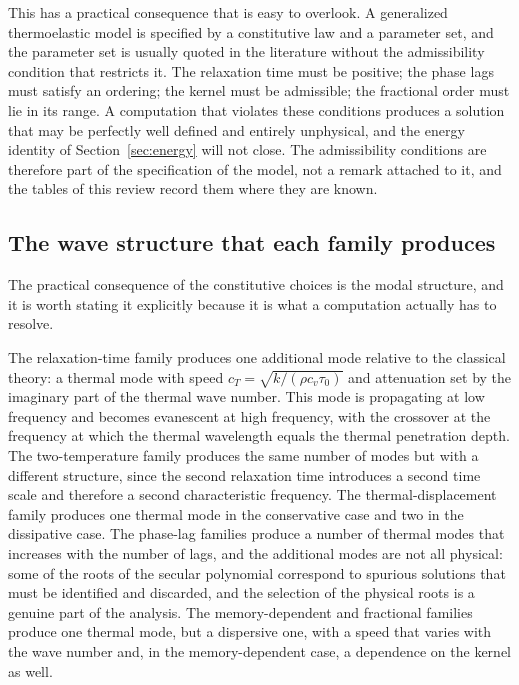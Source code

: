 This has a practical consequence that is easy to overlook. A generalized thermoelastic model is specified by a constitutive law and a parameter set, and the parameter set is usually quoted in the literature without the admissibility condition that restricts it. The relaxation time must be positive; the phase lags must satisfy an ordering; the kernel must be admissible; the fractional order must lie in its range. A computation that violates these conditions produces a solution that may be perfectly well defined and entirely unphysical, and the energy identity of Section~\ref{sec:energy} will not close. The admissibility conditions are therefore part of the specification of the model, not a remark attached to it, and the tables of this review record them where they are known.

\subsection{The wave structure that each family produces}
\label{sec:4.15}

The practical consequence of the constitutive choices is the modal structure, and it is worth stating it explicitly because it is what a computation actually has to resolve.

The relaxation-time family produces one additional mode relative to the classical theory: a thermal mode with speed $c_T = \sqrt{k/(\rho c_v\tau_0)}$ and attenuation set by the imaginary part of the thermal wave number. This mode is propagating at low frequency and becomes evanescent at high frequency, with the crossover at the frequency at which the thermal wavelength equals the thermal penetration depth. The two-temperature family produces the same number of modes but with a different structure, since the second relaxation time introduces a second time scale and therefore a second characteristic frequency. The thermal-displacement family produces one thermal mode in the conservative case and two in the dissipative case. The phase-lag families produce a number of thermal modes that increases with the number of lags, and the additional modes are not all physical: some of the roots of the secular polynomial correspond to spurious solutions that must be identified and discarded, and the selection of the physical roots is a genuine part of the analysis. The memory-dependent and fractional families produce one thermal mode, but a dispersive one, with a speed that varies with the wave number and, in the memory-dependent case, a dependence on the kernel as well.

